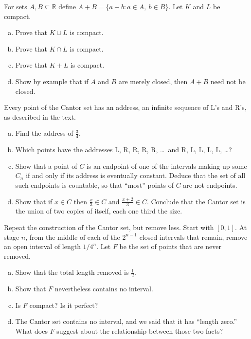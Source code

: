 \begin{problem}
For sets $A, B \subseteq \mathbb{R}$ define $A + B = \{a + b : a \in A,\ b \in B\}$.  Let $K$ and $L$ be compact.
\begin{enumerate}[(a)]
	\item Prove that $K \cup L$ is compact.
	\item Prove that $K \cap L$ is compact.
	\item Prove that $K + L$ is compact.
	\item Show by example that if $A$ and $B$ are merely closed, then $A + B$ need not be closed.
\end{enumerate}
\end{problem}

\begin{problem}
Every point of the Cantor set has an address, an infinite sequence of L's and R's, as described in the text.
\begin{enumerate}[(a)]
	\item Find the address of $\frac34$.
	\item Which points have the addresses L, R, R, R, R, \ldots\ and R, L, L, L, L, \ldots?
	\item Show that a point of $C$ is an endpoint of one of the intervals making up some $C_n$ if and only if its address is eventually constant.  Deduce that the set of all such endpoints is countable, so that ``most'' points of $C$ are not endpoints.
	\item Show that if $x \in C$ then $\frac{x}{3} \in C$ and $\frac{x+2}{3} \in C$.  Conclude that the Cantor set is the union of two copies of itself, each one third the size.
\end{enumerate}
\end{problem}

\begin{problem}
Repeat the construction of the Cantor set, but remove less.  Start with $[0,1]$.  At stage $n$, from the middle of each of the $2^{n-1}$ closed intervals that remain, remove an open interval of length $1/4^n$.  Let $F$ be the set of points that are never removed.
\begin{enumerate}[(a)]
	\item Show that the total length removed is $\frac12$.
	\item Show that $F$ nevertheless contains no interval.
	\item Is $F$ compact?  Is it perfect?
	\item The Cantor set contains no interval, and we said that it has ``length zero.''  What does $F$ suggest about the relationship between those two facts?
\end{enumerate}
\end{problem}

